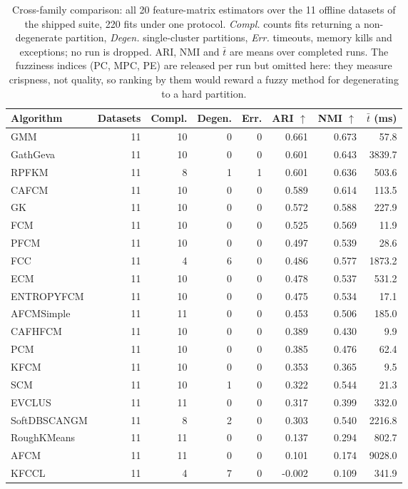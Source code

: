 \begin{table}[t]
\centering
\small
\caption{Cross-family comparison: all 20 feature-matrix estimators over the 11
offline datasets of the shipped suite, 220 fits under one protocol.
\emph{Compl.} counts fits returning a non-degenerate partition, \emph{Degen.}
single-cluster partitions, \emph{Err.} timeouts, memory kills and exceptions;
no run is dropped. ARI, NMI and $\bar{t}$ are means over completed runs. The
fuzziness indices (PC, MPC, PE) are released per run but omitted here: they
measure crispness, not quality, so ranking by them would reward a fuzzy
method for degenerating to a hard partition.}
\label{tab:main-benchmark}
\begin{tabular}{lrrrrrrr}
\toprule
Algorithm & Datasets & Compl. & Degen. & Err. & ARI $\uparrow$ & NMI $\uparrow$ & $\bar{t}$ (ms) \\
\midrule
GMM & 11 & 10 & 0 & 0 & 0.661 & 0.673 & 57.8 \\
GathGeva & 11 & 10 & 0 & 0 & 0.601 & 0.643 & 3839.7 \\
RPFKM & 11 & 8 & 1 & 1 & 0.601 & 0.636 & 503.6 \\
CAFCM & 11 & 10 & 0 & 0 & 0.589 & 0.614 & 113.5 \\
GK & 11 & 10 & 0 & 0 & 0.572 & 0.588 & 227.9 \\
FCM & 11 & 10 & 0 & 0 & 0.525 & 0.569 & 11.9 \\
PFCM & 11 & 10 & 0 & 0 & 0.497 & 0.539 & 28.6 \\
FCC & 11 & 4 & 6 & 0 & 0.486 & 0.577 & 1873.2 \\
ECM & 11 & 10 & 0 & 0 & 0.478 & 0.537 & 531.2 \\
ENTROPYFCM & 11 & 10 & 0 & 0 & 0.475 & 0.534 & 17.1 \\
AFCMSimple & 11 & 11 & 0 & 0 & 0.453 & 0.506 & 185.0 \\
CAFHFCM & 11 & 10 & 0 & 0 & 0.389 & 0.430 & 9.9 \\
PCM & 11 & 10 & 0 & 0 & 0.385 & 0.476 & 62.4 \\
KFCM & 11 & 10 & 0 & 0 & 0.353 & 0.365 & 9.5 \\
SCM & 11 & 10 & 1 & 0 & 0.322 & 0.544 & 21.3 \\
EVCLUS & 11 & 11 & 0 & 0 & 0.317 & 0.399 & 332.0 \\
SoftDBSCANGM & 11 & 8 & 2 & 0 & 0.303 & 0.540 & 2216.8 \\
RoughKMeans & 11 & 11 & 0 & 0 & 0.137 & 0.294 & 802.7 \\
AFCM & 11 & 11 & 0 & 0 & 0.101 & 0.174 & 9028.0 \\
KFCCL & 11 & 4 & 7 & 0 & -0.002 & 0.109 & 341.9 \\
\bottomrule
\end{tabular}
\end{table}
